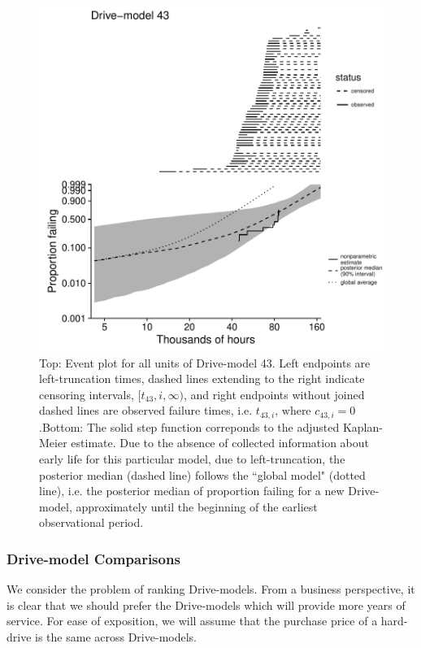\documentclass[12pt]{article}
\begin{document}
\begin{figure}
\centering
\includegraphics{dm43-shrinkage}
\caption{\small Top: Event plot for all units of Drive-model 43. Left endpoints are left-truncation times, dashed lines extending to the right indicate censoring intervals, $[t_{43},i, \infty)$, and right endpoints without joined dashed lines are observed failure times, i.e. $t_{43,i}\mbox{, where }c_{43,i}=0$.\hspace{\textwidth}Bottom: The solid step function correponds to the adjusted Kaplan-Meier estimate. Due to the absence of collected information about early life for this particular model, due to left-truncation, the posterior median (dashed line) follows the ``global model" (dotted line), i.e. the posterior median of proportion failing for a new Drive-model, approximately until the beginning of the earliest observational period.}
\label{fig:ex-mod-43}
\end{figure}

\subsubsection{Drive-model Comparisons}
\label{subsubsec:Drive-model Comparisons}
We consider the problem of ranking Drive-models. From a
business perspective, it is clear
that we should prefer the Drive-models which will provide more years
of service. For ease of exposition, we will assume that the purchase
price of a hard-drive is the same across Drive-models.
\end{document}
